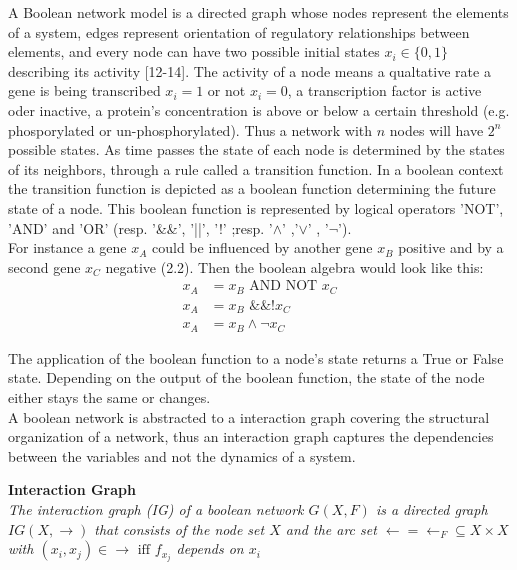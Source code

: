 A Boolean network model is a directed graph whose nodes represent the elements of a system, edges represent orientation of regulatory relationships between elements, and every node can have two possible initial states $x_{i}\in \{0,1\}$ describing its activity [12-14].
The activity of a node means a qualtative rate a gene is being transcribed $x_{i}=1$ or not $x_{i}=0$, a transcription factor is active oder inactive, a protein's concentration is above or below a certain threshold (e.g. phosporylated or un-phosphorylated). Thus a network with $n$ nodes will have $2^{n}$ possible states. As time passes the state of each node is determined by the states of its neighbors, through a rule called a transition function. In a boolean context the transition function is depicted as a boolean function determining the future state of a node. This boolean function is represented by logical operators 'NOT', 'AND' and 'OR' (resp. '\&\&', '||', '!' ;resp. '$\land$' ,'$\lor$' , '$\neg$'). \\
For instance a gene $x_{A}$ could be influenced by another gene $x_{B}$ positive and by a second gene $x_{C}$ negative (2.2). Then the boolean algebra would look like this:
\hspace{-10px}
\begin{equation}
\begin{split}
x_{A}& =x_{B} \text{ AND NOT } x_{C} \\
x_{A}& = x_{B} \text{ \&\&  !} x_{C} \\
x_{A}& = x_{B} \land \neg x_{C} 
\end{split}
\end{equation}

The application of the boolean function to a node's state returns a True or False state. Depending on the output of the boolean function, the state of the node either stays the same or changes. 
\\
A boolean network is abstracted to a interaction graph covering the structural organization of a network, thus an interaction graph captures the dependencies between the variables and not the dynamics of a system.

\begin{defn}\textbf{Interaction Graph}\\
\textit{The interaction graph (\gls{IG}) of a boolean network $G(X,F)$ is a directed graph $IG(X,\rightarrow)$ that consists of the node set $X$ and the arc set $\leftarrow = \leftarrow _{F} \subseteq X \times X$ with $(x_{i},x_{j})\in \rightarrow \text{ iff }f_{x_{j}}$ depends on $x_{i}$ }
\end{defn} 

